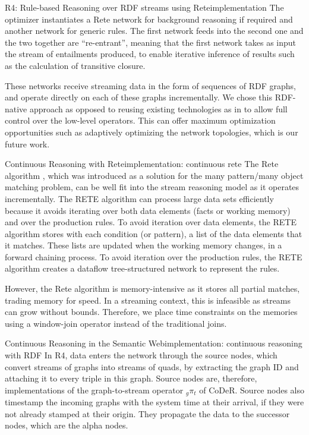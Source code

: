 \begin{nestedsection}{R4: Rule-based Reasoning over RDF streams using Rete}{implementation}
	The optimizer instantiates a Rete network for background reasoning if required and another network for generic rules.
	The first network feeds into the second one and the two together are ``re-entrant'', meaning that the first network takes as input the stream of entailments produced, to enable iterative inference of results such as the calculation of transitive closure.
	
	These networks receive streaming data in the form of sequences of RDF graphs, and operate directly on each of these graphs incrementally.
	We chose this RDF-native approach as opposed to reusing existing technologies as in \citep{C-SPARQL,streaming-sparql} to allow full control over the low-level operators.
	This can offer maximum optimization opportunities such as adaptively optimizing the network topologies, which is our future work.

	\begin{nestedsection}{Continuous Reasoning with Rete}{implementation: continuous rete}
		The Rete algorithm \citep{forgy79}, which was introduced as a solution for the many pattern/many object matching problem, can be well fit into the stream reasoning model as it operates incrementally.
		The RETE algorithm can process large data sets efficiently because it avoids iterating over both data elements (facts or working memory) and over the production rules.
		To avoid iteration over data elements, the RETE algorithm stores with each condition (or pattern), a list of the data elements that it matches.
		These lists are updated when the working memory changes, in a forward chaining process.
		To avoid iteration over the production rules, the RETE algorithm creates a dataflow tree-structured network to represent the rules.

		However, the Rete algorithm is memory-intensive as it stores all partial matches, trading memory for speed.
		In a streaming context, this is infeasible as streams can grow without bounds.
		Therefore, we place time constraints on the memories using a window-join operator instead of the traditional joins.
	\end{nestedsection}
	\begin{nestedsection}{Continuous Reasoning in the Semantic Web}{implementation: continuous reasoning with RDF}
		In R4, data enters the network through the source nodes, which convert streams of graphs into streams of quads, by extracting the graph ID and attaching it to every triple in this graph.
		Source nodes are, therefore, implementations of the graph-to-stream operator ${{}_g{\pi_t}}$ of CoDeR.
		Source nodes also timestamp the incoming graphs with the system time at their arrival, if they were not already stamped at their origin.
		They propagate the data to the successor nodes, which are the alpha nodes.


\end{nestedsection}
\end{nestedsection}
